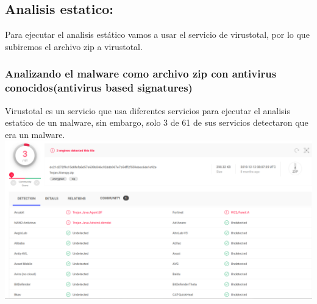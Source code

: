 \documentclass[10pt,a4paper]{article} %
\begin{document}
            \subsection{Analisis  estatico:}
                Para ejecutar el analisis  estático vamos a usar el servicio de
                virustotal, por lo que subiremos el archivo zip a virustotal.

                \subsubsection{Analizando el malware como archivo zip con
                antivirus conocidos(antivirus based signatures)}

                    Virustotal es un servicio que usa diferentes servicios para
                    ejecutar el analisis  estatico de un malware, sin embargo, solo 3
                    de 61 de sus servicios detectaron que era un malware.
                    \\\includegraphics[width=0.5\linewidth]{virustotal_antivirus.png}
\end{document}
